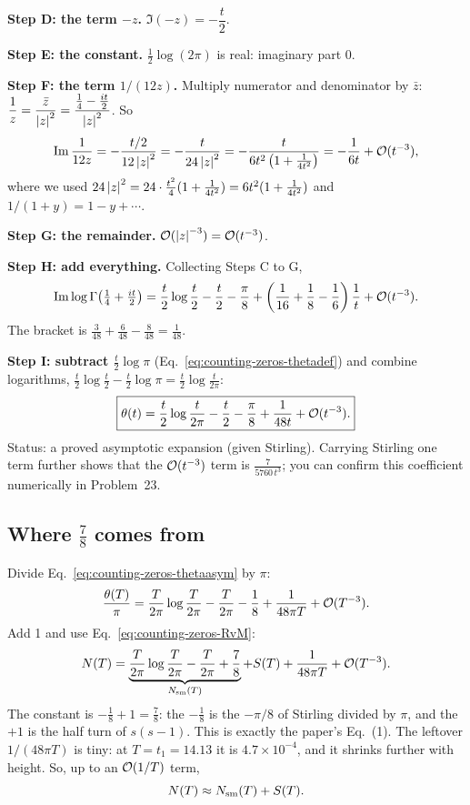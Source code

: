 \textbf{Step D: the term $-z$.} $\Im(-z)=-\dfrac t2$.

\textbf{Step E: the constant.} $\tfrac12\log(2\pi)$ is real: imaginary part $0$.

\textbf{Step F: the term $1/(12z)$.} Multiply numerator and denominator by $\bar z$: $\dfrac1z=\dfrac{\bar z}{\left\lvert z\right\rvert^2}=\dfrac{\tfrac14-\tfrac{it}{2}}{\left\lvert z\right\rvert^2}$. So
\begin{equation}
\operatorname{Im}\frac{1}{12z}=-\frac{t/2}{12\left\lvert z\right\rvert^2}=-\frac{t}{24\left\lvert z\right\rvert^2}=-\frac{t}{6t^2\left(1+\frac{1}{4t^2}\right)}=-\frac{1}{6t}+\mathcal{O}(t^{-3}),
\end{equation}
where we used $24\left\lvert z\right\rvert^2=24\cdot\frac{t^2}{4}(1+\frac1{4t^2})=6t^2(1+\frac1{4t^2})$ and $1/(1+y)=1-y+\cdots$.

\textbf{Step G: the remainder.} $\mathcal{O}(\left\lvert z\right\rvert^{-3})=\mathcal{O}(t^{-3})$.

\textbf{Step H: add everything.} Collecting Steps C to G,
\begin{equation}
\operatorname{Im}\log\Gamma\!\left(\tfrac14+\tfrac{it}{2}\right)=\frac t2\log\frac t2-\frac t2-\frac\pi8+\left(\frac1{16}+\frac18-\frac16\right)\frac1t+\mathcal{O}(t^{-3}).
\end{equation}
The bracket is $\frac{3}{48}+\frac{6}{48}-\frac{8}{48}=\frac{1}{48}$.

\textbf{Step I: subtract $\tfrac t2\log\pi$} (Eq.~\eqref{eq:counting-zeros-thetadef}) and combine logarithms, $\frac t2\log\frac t2-\frac t2\log\pi=\frac t2\log\frac{t}{2\pi}$:
\begin{equation}
\boxed{\theta(t)=\frac t2\log\frac{t}{2\pi}-\frac t2-\frac\pi8+\frac{1}{48t}+\mathcal{O}(t^{-3}).}
\label{eq:counting-zeros-thetaasym}
\end{equation}
Status: a proved asymptotic expansion (given Stirling). Carrying Stirling one term further shows that the $\mathcal{O}(t^{-3})$ term is $\frac{7}{5760\,t^3}$; you can confirm this coefficient numerically in Problem~23.

\subsection{Where $\tfrac78$ comes from}

Divide Eq.~\eqref{eq:counting-zeros-thetaasym} by $\pi$:
\begin{equation}
\frac{\theta(T)}{\pi}=\frac{T}{2\pi}\log\frac{T}{2\pi}-\frac{T}{2\pi}-\frac18+\frac{1}{48\pi T}+\mathcal{O}(T^{-3}).
\end{equation}
Add 1 and use Eq.~\eqref{eq:counting-zeros-RvM}:
\begin{equation}
N(T)=\underbrace{\frac{T}{2\pi}\log\frac{T}{2\pi}-\frac{T}{2\pi}+\frac78}_{N_{\mathrm{sm}}(T)}+S(T)+\frac{1}{48\pi T}+\mathcal{O}(T^{-3}).
\label{eq:counting-zeros-NsmS}
\end{equation}
The constant is $-\tfrac18+1=\tfrac78$: the $-\tfrac18$ is the $-\pi/8$ of Stirling divided by $\pi$, and the $+1$ is the half turn of $s(s-1)$. This is exactly the paper's Eq.~(1). The leftover $1/(48\pi T)$ is tiny: at $T=t_1=14.13$ it is $4.7\times10^{-4}$, and it shrinks further with height. So, up to an $\mathcal{O}(1/T)$ term,
\begin{equation}
N(T)\approx N_{\mathrm{sm}}(T)+S(T).
\label{eq:counting-zeros-split}
\end{equation}


